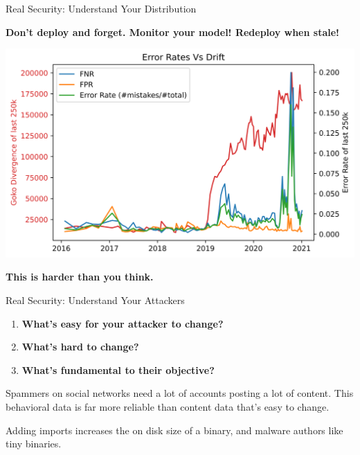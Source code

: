 \documentclass{beamer}
\begin{document}
\begin{frame}{Real Security: Understand Your Distribution}
    \begin{center}
        \textbf{Don't deploy and forget. Monitor your model! Redeploy when stale!}
        \vspace{10pt}
        
        \includegraphics[scale=0.5]{overall_vs_error.png}

        \textbf{This is harder than you think.} 
    \end{center}
\end{frame}

\begin{frame}{Real Security: Understand Your Attackers}
    \begin{center}
        \begin{enumerate}
            \item \textbf{What's easy for your attacker to change?}
            \item \textbf{What's hard to change?}
            \item \textbf{What's fundamental to their objective?}
        \end{enumerate}
        \vspace{20pt}

        Spammers on social networks need a lot of accounts posting a lot of content. This behavioral data is far more reliable than content data that's easy to change.
        \vspace{10pt}
        
        Adding imports increases the on disk size of a binary, and malware authors like tiny binaries.
    \end{center}
\end{frame}
\end{document}

